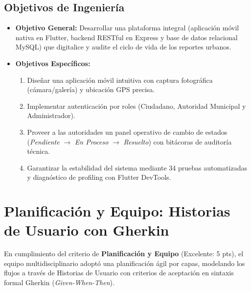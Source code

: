 \documentclass[12pt,a4paper]{article}
\begin{document}
\subsection{Objetivos de Ingeniería}
\begin{itemize}[leftmargin=*]
    \item \textbf{Objetivo General:} Desarrollar una plataforma integral (aplicación móvil nativa en Flutter, backend RESTful en Express y base de datos relacional MySQL) que digitalice y audite el ciclo de vida de los reportes urbanos.
    \item \textbf{Objetivos Específicos:}
    \begin{enumerate}
        \item Diseñar una aplicación móvil intuitiva con captura fotográfica (cámara/galería) y ubicación GPS precisa.
        \item Implementar autenticación por roles (Ciudadano, Autoridad Municipal y Administrador).
        \item Proveer a las autoridades un panel operativo de cambio de estados (\textit{Pendiente} $\rightarrow$ \textit{En Proceso} $\rightarrow$ \textit{Resuelto}) con bitácoras de auditoría técnica.
        \item Garantizar la estabilidad del sistema mediante 34 pruebas automatizadas y diagnóstico de profiling con Flutter DevTools.
    \end{enumerate}
\end{itemize}

\section{Planificación y Equipo: Historias de Usuario con Gherkin}

En cumplimiento del criterio de \textbf{Planificación y Equipo} (Excelente: 5 pts), el equipo multidisciplinario adoptó una planificación ágil por capas, modelando los flujos a través de Historias de Usuario con criterios de aceptación en sintaxis formal Gherkin (\textit{Given-When-Then}).
\end{document}
